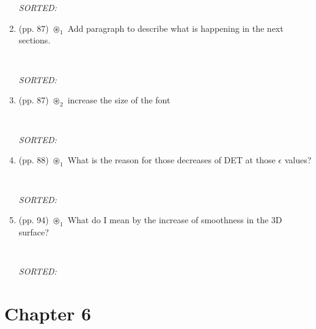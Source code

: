 \documentclass[12pt]{article}
\begin{document}
\begin{enumerate}
\begin{verbatim}
	\end{verbatim}
	\textit{
	SORTED:  
	}
	\\


\item  (pp. 87) $\circledast_1$ 
	Add paragraph to describe what is happening in the next
	sections.
	\begin{verbatim}
	
	\end{verbatim}
	\textit{
	SORTED:  
	}
	\\

\item  (pp. 87) $\circledast_2$ 
	increase the size of the font
	\begin{verbatim}
	
	\end{verbatim}
	\textit{
	SORTED:  
	}
	\\


\item  (pp. 88) $\circledast_1$ 
	What is the reason for those
	decreases of DET at those $\epsilon$ values?
	\begin{verbatim}
	
	\end{verbatim}
	\textit{
	SORTED:  
	}
	\\

\item  (pp. 94) $\circledast_1$ 
	What do I mean by the increase of smoothness
	in the 3D surface?
	\begin{verbatim}
	
	\end{verbatim}
	\textit{
	SORTED:  
	}
	\\





\end{enumerate}




\section{Chapter 6}
\end{document}
